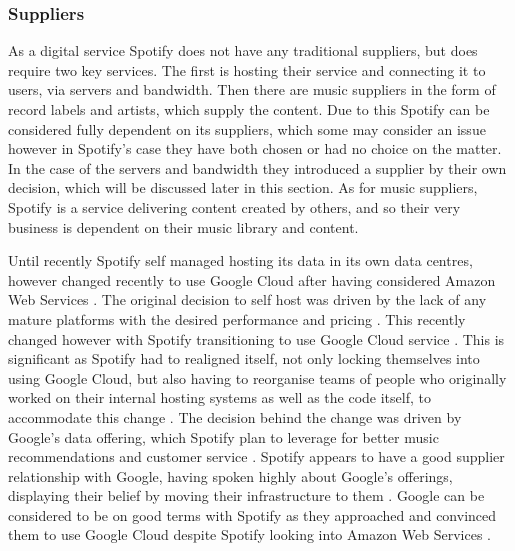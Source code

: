 \subsubsection{Suppliers} \label{environment:suppliers}
As a digital service Spotify does not have any traditional suppliers, but does require two key services. The first is hosting their service and connecting it to users, via servers and bandwidth. Then there are music suppliers in the form of record labels and artists, which supply the content. Due to this Spotify can be considered fully dependent on its suppliers, which some may consider an issue \parencite{dependent_on_suppliers} however in Spotify's case they have both chosen or had no choice on the matter. In the case of the servers and bandwidth they introduced a supplier by their own decision, which will be discussed later in this section. As for music suppliers, Spotify is a service delivering content created by others, and so their very business is dependent on their music library and content.
\par 
Until recently Spotify self managed hosting its data in its own data centres, however changed recently to use Google Cloud after having considered Amazon Web Services \parencite{siliconangle_spotify_google_cloud, google_lures_spotify}. The original decision to self host was driven by the lack of any mature platforms with the desired performance and pricing \parencite{siliconangle_spotify_google_cloud}. This recently changed however with Spotify transitioning to use Google Cloud service \parencite{siliconangle_spotify_google_cloud, spotify_announce_google_cloud}. This is significant as Spotify had to realigned itself, not only locking themselves into using Google Cloud, but also having to reorganise teams of people who originally worked on their internal hosting systems as well as the code itself, to accommodate this change \parencite{forbes_why_spotify_google_cloud}. The decision behind the change was driven by Google's data offering, which Spotify plan to leverage for better music recommendations and customer service \parencite{forbes_why_spotify_google_cloud, spotify_announce_google_cloud}. Spotify appears to have a good supplier relationship with Google, having spoken highly about Google's offerings, displaying their belief by moving their infrastructure to them \parencite{spotify_announce_google_cloud}. Google can be considered to be on good terms with Spotify as they approached and convinced them to use Google Cloud despite Spotify looking into Amazon Web Services \parencite{google_lures_spotify}.
